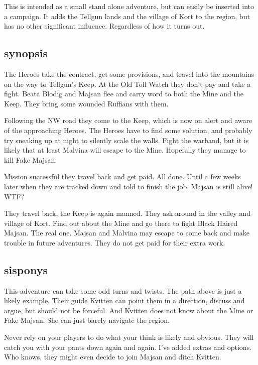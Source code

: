 \vspace{2.0\baselineskip}


\noindent
This is intended as a small stand alone adventure, but can easily be inserted into a campaign. It adds the Tellgun lands and the village of Kort to the region, but has no other significant influence. Regardless of how it turns out.


\subsection*{synopsis}
The Heroes take the contract, get some provisions, and travel into the mountains on the way to Tellgun's Keep. At the Old Toll Watch they don't pay and take a fight. Beata Blodig and Majsan flee and carry word to both the Mine and the Keep. They bring some wounded Ruffians with them.

Following the NW road they come to the Keep, which is now on alert and aware of the approaching Heroes. The Heroes have to find some solution, and probably try sneaking up at night to silently scale the walls. Fight the warband, but it is likely that at least Malvina will escape to the Mine. Hopefully they manage to kill Fake Majsan.

Mission successful they travel back and get paid. All done. Until a few weeks later when they are tracked down and told to finish the job. Majsan is still alive! WTF?

They travel back, the Keep is again manned. They ask around in the valley and village of Kort. Find out about the Mine and go there to fight Black Haired Majsan. The real one. Majsan and Malvina may escape to come back and make trouble in future adventures. They do not get paid for their extra work.


\subsection*{sisponys}
This adventure can take some odd turns and twists. The path above is just a likely example. Their guide Kvitten can point them in a direction, discuss and argue, but should not be forceful. And Kvitten does not know about the Mine or Fake Majsan. She can just barely navigate the region.

Never rely on your players to do what your think is likely and obvious. They will catch you with your pants down again and again. I've added extras and options. Who knows, they might even decide to join Majsan and ditch Kvitten.



